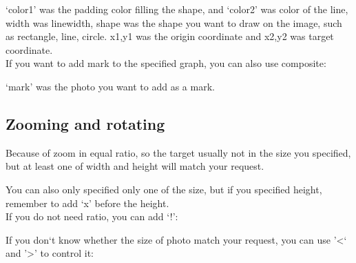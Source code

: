 \documentclass[12pt]{article}
\begin{document}
{\centering{}\par}\vspace{5mm}

`color1' was the padding color filling the shape, and `color2' was color of the line, width was linewidth, shape was the shape you want to draw on the image, such as rectangle, line, circle. x1,y1 was the origin coordinate and x2,y2 was target coordinate.\\

If you want to add mark to the specified graph, you can also use composite:\vspace{5mm}

{\centering{}\par}\vspace{5mm}

`mark' was the photo you want to add as a mark.

\subsection{Zooming and rotating}
{\centering{}\par}\vspace{5mm}

Because of zoom in equal ratio, so the target usually not in the size you specified, but at least one of width and height will match your request.

You can also only specified only one of the size, but if you specified height, remember to add `x' before the height.\\

If you do not need ratio, you can add `!':\vspace{5mm}

{\centering{}\par} \vspace{5mm}

If you don`t know whether the size of photo match your request, you can use '\textless` and '\textgreater' to control it:\vspace{5mm}

{\centering{}\par}\vspace{5mm}
\end{document}
